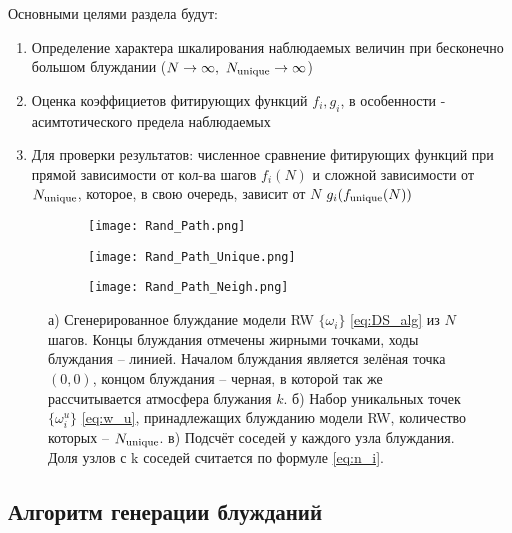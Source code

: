 Основными целями раздела будут:

\begin{enumerate}
\item Определение характера шкалирования наблюдаемых величин при бесконечно большом блуждании ($N \to \infty,\ \Nun \to \infty$)
\item Оценка коэффициетов фитирующих функций $f_i, g_i$, в особенности - асимтотического предела наблюдаемых
\item Для проверки результатов: численное сравнение фитирующих функций при прямой зависимости от кол-ва шагов $f_i(N)$ и сложной зависимости от $N_{\textup{unique}}$, которое, в свою очередь, зависит от $N$ $g_i(f_{\textup{unique}}(N))$
\end{enumerate}



\begin{figure}[h]
    
\begin{subfigure}{0.5\textwidth}
    \texttt{[image: Rand\_Path.png]}
    \caption{}
    \label{fig:path_1}
\end{subfigure}
\hfill
\begin{subfigure}{0.5\textwidth}
    \texttt{[image: Rand\_Path\_Unique.png]}
    \caption{}
    \label{fig:path_2}
\end{subfigure}
\vfill
\centering
\begin{subfigure}{0.5\textwidth}
\texttt{[image: Rand\_Path\_Neigh.png]}
\caption{}
\label{fig:path_3}
\end{subfigure}
\caption{а) Сгенерированное блуждание модели RW $\{\omega_i\}$ \eqref{eq:DS_alg} из $N$ шагов. Концы блуждания отмечены жирными точками, ходы блуждания -- линией. Началом блуждания является зелёная точка $(0,0)$, концом блуждания -- черная, в которой так же рассчитывается атмосфера блужания $k$. б) Набор уникальных точек $\{\omega^u_i\}$ \eqref{eq:w_u}, принадлежащих блужданию модели RW, количество которых -- $N_{\textup{unique}}$. в) Подсчёт соседей у каждого узла блуждания. Доля узлов с k соседей считается по формуле \eqref{eq:n_i}.}
\end{figure}

\subsection{Алгоритм генерации блужданий}

